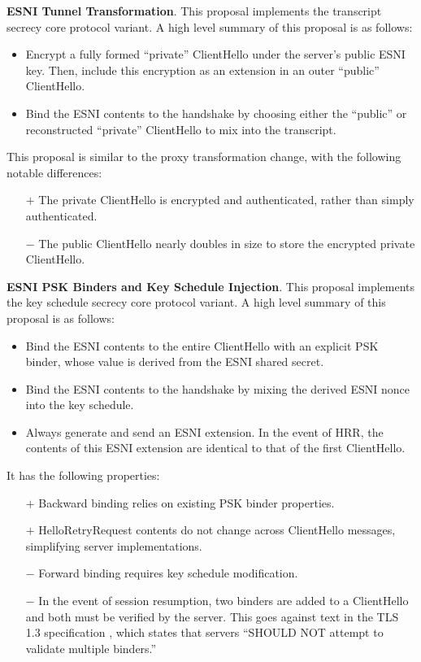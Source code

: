 \documentclass{article}
\theoremstyle{definition}
\theoremstyle{definition}
\begin{document}
\textbf{ESNI Tunnel Transformation}. This proposal implements the transcript secrecy core protocol variant. 
A high level summary of this proposal is as follows:
%
\begin{itemize}
  \item Encrypt a fully formed ``private'' ClientHello under the server's public ESNI key. Then, include
  this encryption as an extension in an outer ``public'' ClientHello.
  \item Bind the ESNI contents to the handshake by choosing either the ``public'' or reconstructed
  ``private'' ClientHello to mix into the transcript.
\end{itemize}
%
This proposal is similar to the proxy transformation change, with the following notable differences:
%
\begin{itemize}
  \item[$+$] The private ClientHello is encrypted and authenticated, rather than simply authenticated.
  \item[$-$] The public ClientHello nearly doubles in size to store the encrypted private ClientHello.
\end{itemize}
%

\textbf{ESNI PSK Binders and Key Schedule Injection}. This proposal implements the key schedule secrecy 
core protocol variant. A high level summary of this proposal is as follows:
%
\begin{itemize}
  \item Bind the ESNI contents to the entire ClientHello with an explicit PSK binder, whose value is
  derived from the ESNI shared secret.
  \item Bind the ESNI contents to the handshake by mixing the derived ESNI nonce into the key schedule.
  \item Always generate and send an ESNI extension. In the event of HRR, the contents of this ESNI 
  extension are identical to that of the first ClientHello.
\end{itemize}
%
It has the following properties:
%
\begin{itemize}
  \item[$+$] Backward binding relies on existing PSK binder properties.
  \item[$+$] HelloRetryRequest contents do not change across ClientHello messages, simplifying server
  implementations.
  \item[$-$] Forward binding requires key schedule modification.
  \item[$-$] In the event of session resumption, two binders are added to a ClientHello and both
  must be verified by the server. This goes against text in the TLS 1.3 specification \cite{rfc8446}, 
  which states that servers ``SHOULD NOT attempt to validate multiple binders.''
\end{itemize}
%
\end{document}

